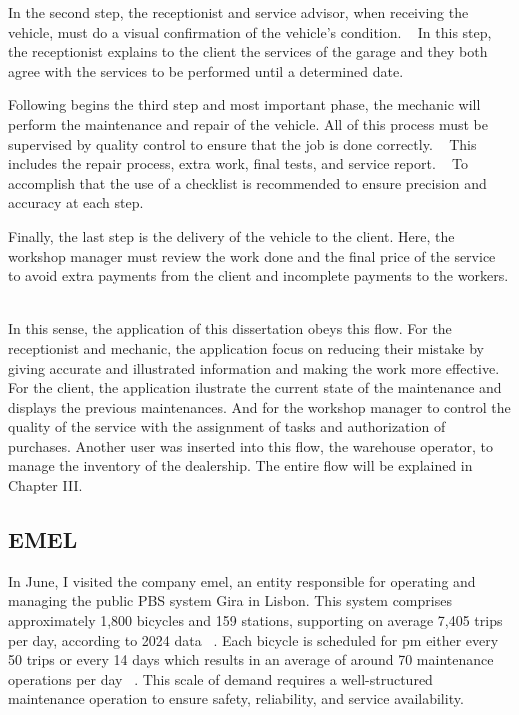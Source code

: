 In the second step, the receptionist and service advisor, when receiving the vehicle, must do a visual confirmation of the vehicle's condition. ~\cite{Setting_the_after_sale_process}
In this step, the receptionist explains to the client the services of the garage and they both agree with the services to be performed until a determined date. ~\cite{Setting_the_after_sale_process}

Following begins the third step and most important phase, the mechanic will perform the maintenance and repair of the vehicle. 
All of this process must be supervised by quality control to ensure that the job is done correctly. ~\cite{Setting_the_after_sale_process}
This includes the repair process, extra work, final tests, and service report. ~\cite{Setting_the_after_sale_process}
To accomplish that the use of a checklist is recommended to ensure precision and accuracy at each step. ~\cite{Setting_the_after_sale_process}

Finally, the last step is the delivery of the vehicle to the client. 
Here, the workshop manager must review the work done and the final price of the service to avoid extra payments from the client and incomplete payments to the workers. ~\cite{Setting_the_after_sale_process}

In this sense, the application of this dissertation obeys this flow.
For the receptionist and mechanic, the application focus on reducing their mistake by giving accurate and illustrated information and making the work more effective.
For the client, the application ilustrate the current state of the maintenance and displays the previous maintenances.
And for the workshop manager to control the quality of the service with the assignment of tasks and authorization of purchases. 
Another user was inserted into this flow, the warehouse operator, to manage the inventory of the dealership. 
The entire flow will be explained in Chapter III. 


\subsection{EMEL}


In June, I visited the company \acs{emel}, an entity responsible for operating and managing the public \acs{PBS} system Gira in Lisbon. This system comprises approximately 1,800 bicycles and 159 stations, supporting on average 7,405 trips per day, according to 2024 data ~\cite{Gira_Trips}. Each bicycle is scheduled for \acs{pm} either every 50 trips or every 14 days which results in an average of around 70 maintenance operations per day ~\cite{Gira_Maintenance}. This scale of demand requires a well-structured maintenance operation to ensure safety, reliability, and service availability.

